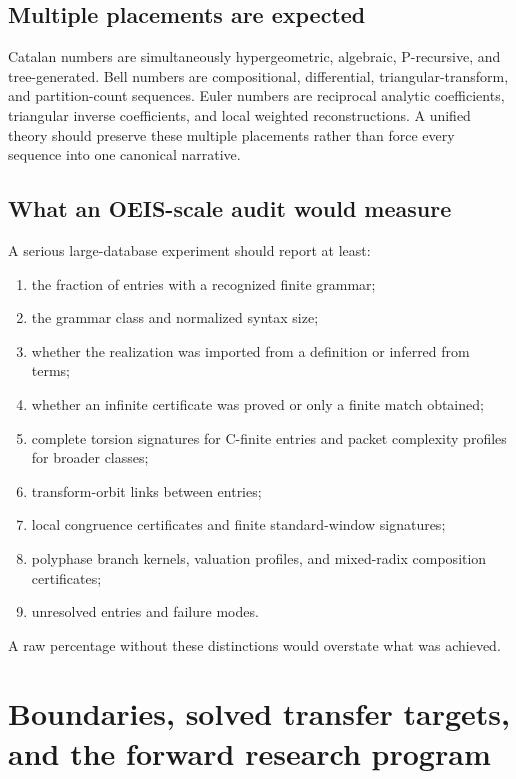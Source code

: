 \documentclass[11pt]{article}
\theoremstyle{definition}\newtheorem{definition}[theorem]{Definition}\newtheorem{example}[theorem]{Example}\newtheorem{construction}[theorem]{Construction}\newtheorem{algorithm}[theorem]{Algorithm}\newtheorem{conjecture}[theorem]{Conjecture}\newtheorem{problem}[theorem]{Problem}
\theoremstyle{remark}\newtheorem{remark}[theorem]{Remark}\newtheorem{boundary}[theorem]{Boundary}\newtheorem{certificate}[theorem]{Computational Certificate}\newtheorem{classical}[theorem]{Classical Input}\newtheorem{principle}[theorem]{Structural Principle}
\begin{document}
\subsection{Multiple placements are expected}
Catalan numbers are simultaneously hypergeometric, algebraic, P-recursive, and tree-generated.  Bell numbers are compositional, differential, triangular-transform, and partition-count sequences.  Euler numbers are reciprocal analytic coefficients, triangular inverse coefficients, and local weighted reconstructions.  A unified theory should preserve these multiple placements rather than force every sequence into one canonical narrative.

\subsection{What an OEIS-scale audit would measure}
A serious large-database experiment should report at least:
\begin{enumerate}
\item the fraction of entries with a recognized finite grammar;
\item the grammar class and normalized syntax size;
\item whether the realization was imported from a definition or inferred from terms;
\item whether an infinite certificate was proved or only a finite match obtained;
\item complete torsion signatures for C-finite entries and packet complexity profiles for broader classes;
\item transform-orbit links between entries;
\item local congruence certificates and finite standard-window signatures;
\item polyphase branch kernels, valuation profiles, and mixed-radix composition certificates;
\item unresolved entries and failure modes.
\end{enumerate}
A raw percentage without these distinctions would overstate what was achieved.


\section{Boundaries, solved transfer targets, and the forward research program}
\end{document}
